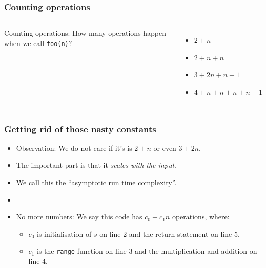 \begin{frame}
	\frametitle{Counting operations}
	\begin{columns}
			
		
Counting operations:			How many operations happen when we call \texttt{foo(n)}?
			\begin{itemize}
				\item $2 + n$
				\item $2 + n + n$
				\item $3 + 2n + n-1$
				\item $4 + n + n + n + n-1$
			\end{itemize}
	\end{columns}
\end{frame}

\begin{frame}
	\frametitle{Getting rid of those nasty constants}

	\begin{itemize}
		\item Observation: We do not care if it's is $2+n$ or even $3+2n$.
		\item The important part is that it \textit{scales with the input}.
			
		\item We call this the ``asymptotic run time complexity''.
	
		\item 

		\item No more numbers:		We say this code has $c_0 + c_1n$ operations, where:
		\begin{itemize}
			\item $c_0$ is initialisation of $s$ on line 2 and the return statement on line 5.
			\item $c_1$ is the \texttt{range} function on line 3 and the multiplication and addition on line 4.
		\end{itemize}
	\end{itemize}
\end{frame}

